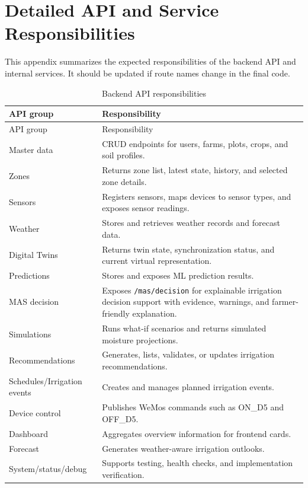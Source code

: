 \chapter{Detailed API and Service Responsibilities}

This appendix summarizes the expected responsibilities of the backend API and internal services. It should be updated if route names change in the final code.

\begin{footnotesize}
\setlength{\tabcolsep}{2pt}
\begin{longtable}{@{}>{\raggedright\arraybackslash}p{}>{\raggedright\arraybackslash}p{}@{}}
\caption{Backend API responsibilities}\\
\toprule
API group & Responsibility \\
\midrule
\endfirsthead
\toprule
API group & Responsibility \\
\midrule
\endhead
Master data & CRUD endpoints for users, farms, plots, crops, and soil profiles. \\
Zones & Returns zone list, latest state, history, and selected zone details. \\
Sensors & Registers sensors, maps devices to sensor types, and exposes sensor readings. \\
Weather & Stores and retrieves weather records and forecast data. \\
Digital Twins & Returns twin state, synchronization status, and current virtual representation. \\
Predictions & Stores and exposes ML prediction results. \\
MAS decision & Exposes \texttt{/mas/decision} for explainable irrigation decision support with evidence, warnings, and farmer-friendly explanation. \\
Simulations & Runs what-if scenarios and returns simulated moisture projections. \\
Recommendations & Generates, lists, validates, or updates irrigation recommendations. \\
Schedules/Irrigation events & Creates and manages planned irrigation events. \\
Device control & Publishes WeMos commands such as ON\_D5 and OFF\_D5. \\
Dashboard & Aggregates overview information for frontend cards. \\
Forecast & Generates weather-aware irrigation outlooks. \\
System/status/debug & Supports testing, health checks, and implementation verification. \\
\bottomrule
\end{longtable}
\end{footnotesize}

